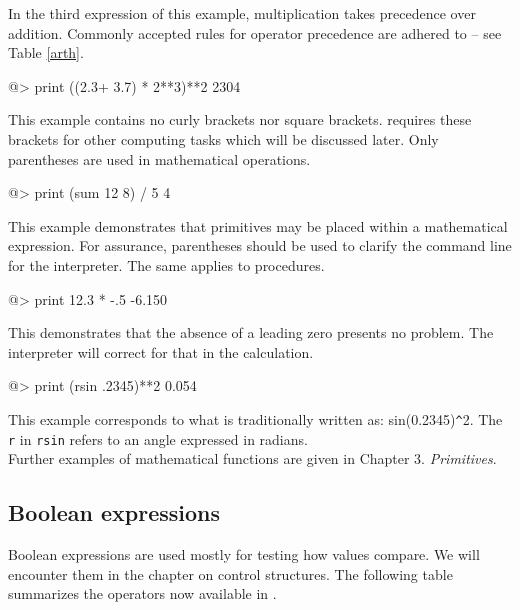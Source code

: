 In the third expression of this example, multiplication takes precedence over addition.  Commonly accepted rules for operator precedence are adhered to -- see Table \ref{arth}.
 
\begin{verbatimtab}
@> print ((2.3+ 3.7) * 2**3)**2
2304
\end{verbatimtab} 

This example contains no curly brackets nor square brackets.  \squirrel requires these brackets for other computing tasks which will be discussed later.  Only parentheses are used in mathematical operations.

\begin{verbatimtab} 
@> print (sum 12 8) / 5 
4
\end{verbatimtab} 
 
This example demonstrates that primitives may be placed within a mathematical expression.  For assurance, parentheses should be used to clarify the command line for the interpreter.   The same applies to procedures. 
 
\begin{verbatimtab}
@> print 12.3 * -.5 
-6.150
\end{verbatimtab} 
 
This demonstrates that the absence of a leading zero presents no problem.  The interpreter will correct for that in the calculation.
 
\begin{verbatimtab} 
@> print (rsin .2345)**2 
0.054
\end{verbatimtab} 
 
This example corresponds to what is traditionally written as: sin(0.2345)\verb+^+2.  The \verb+r+ in \verb+rsin+ refers to an angle expressed in radians.\\ 
 
Further examples of mathematical functions are given in Chapter 3. {\em Primitives}.
 
\subsection{Boolean expressions} 
 
Boolean expressions are used mostly for testing how values compare.  We will encounter them in the chapter on control structures. The following table summarizes the operators now available in \squirrel. 

